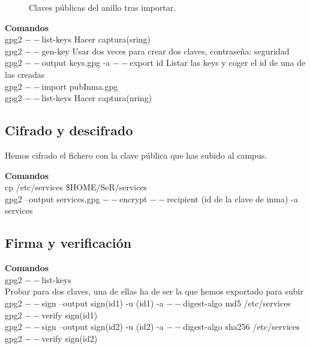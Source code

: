 \documentclass[11pt]{article}
\begin{document}
      \begin{figure}[!ht]
        \centering
        \caption{Claves públicas del anillo tras importar.}
      \end{figure}

      \par
      \textbf{Comandos}\\
      gpg2 $--$list-keys \hspace{10mm} Hacer captura(sring)\\
      \vspace{2mm}
      gpg2 $--$gen-key \hspace{10mm} Usar dos veces para crear dos claves, contraseña: seguridad\\
      gpg2 $--$output keys.gpg -a $--$export id \hspace{10mm} Listar las keys y coger el id de una de las creadas\\
      \vspace{2mm}
      gpg2 $--$import pubInma.gpg\\
      gpg2 $--$list-keys \hspace{10mm} Hacer captura(nring)\\

    \subsection{Cifrado y descifrado}
      \par
      Hemos cifrado el fichero con la clave pública que has subido al campus.

      \par
      \textbf{Comandos}\\
      cp /etc/services \$HOME/SeR/services\\
      gpg2 --output services.gpg $--$encrypt $--$recipient (id de la clave de inma) -a services

    \subsection{Firma y verificación}
      \par
      \textbf{Comandos}\\
      gpg2 $--$list-keys\\
      Probar para dos claves, una de ellas ha de ser la que hemos exportado para subir\\
      \vspace{2mm}
      gpg2 $--$sign --output sign(id1) -u (id1) -a $--$digest-algo md5 /etc/services\\
      gpg2 $--$verify sign(id1)\\
      \vspace{2mm}
      gpg2 $--$sign --output sign(id2) -u (id2) -a $--$digest-algo sha256 /etc/services\\
      gpg2 $--$verify sign(id2)\\
\end{document}
